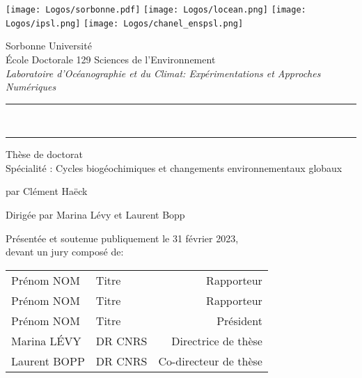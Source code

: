 

\begin{titlingpage}

\begin{center}
  \texttt{[image: Logos/sorbonne.pdf]}
  \hfill
  \texttt{[image: Logos/locean.png]}
  \hfill
  \texttt{[image: Logos/ipsl.png]}
  \hfill
  \texttt{[image: Logos/chanel\_enspsl.png]}

  \vspace{1cm}

  {\LARGE Sorbonne Université}\\[2ex]
  École Doctorale 129 Sciences de l'Environnement\\
  \emph{Laboratoire d'Océanographie et du Climat: Expérimentations et Approches Numériques}

  \vspace{3cm}

  \par\noindent\rule[0.7em]{\textwidth}{2pt}
  {\bfseries\Large \Title}\\
  \par\noindent\rule{\textwidth}{2pt}

  \vspace{3cm}

  Thèse de doctorat\\
  Spécialité : Cycles biogéochimiques et changements environnementaux globaux

  \vspace{1cm}

  {\normalsize par Clément Haëck}

  \vspace{1cm}

  Dirigée par Marina Lévy et Laurent Bopp

  \vspace{2cm}
\end{center}

\par\noindent Présentée et soutenue publiquement le 31 février 2023,\\
devant un jury composé de:

\begin{center}
\begin{tabular}{llr<{\raggedleft}}
  Prénom NOM & Titre & Rapporteur \\
  Prénom NOM & Titre & Rapporteur \\
  Prénom NOM & Titre & Président \\
  Marina LÉVY & DR CNRS & Directrice de thèse \\
  Laurent BOPP & DR CNRS & Co-directeur de thèse \\
\end{tabular}
\end{center}

\end{titlingpage}
\restoregeometry

